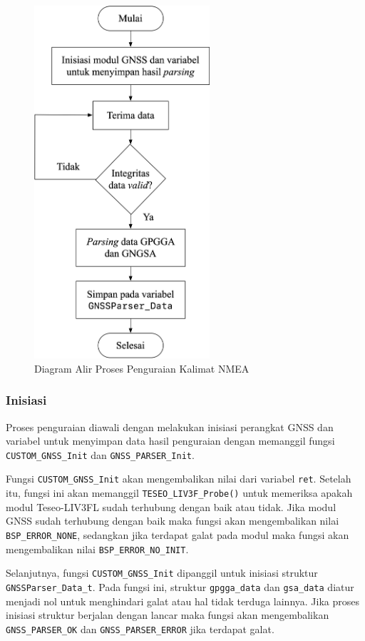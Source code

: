 \begin{figure}[H]
	\centering
	\includegraphics[width=6.5cm]{contents/chapter-3/diagram-parser.png}
	\caption{Diagram Alir Proses Penguraian Kalimat NMEA}
	\label{Fig: flowchart-parsing}
\end{figure}

\subsubsection{Inisiasi}
Proses penguraian diawali dengan melakukan inisiasi perangkat GNSS dan variabel untuk menyimpan data hasil penguraian dengan memanggil fungsi \texttt{CUSTOM\_GNSS\_Init} dan \texttt{GNSS\_PARSER\_Init}. 

Fungsi \texttt{CUSTOM\_GNSS\_Init} akan mengembalikan nilai dari variabel \texttt{ret}. Setelah itu, fungsi ini akan memanggil \texttt{TESEO\_LIV3F\_Probe()} untuk memeriksa apakah modul Teseo-LIV3FL sudah terhubung dengan baik atau tidak. Jika modul GNSS sudah terhubung dengan baik maka fungsi akan mengembalikan nilai \texttt{BSP\_ERROR\_NONE}, sedangkan jika terdapat galat pada modul maka fungsi akan mengembalikan nilai \texttt{BSP\_ERROR\_NO\_INIT}.

Selanjutnya, fungsi  \texttt{CUSTOM\_GNSS\_Init} dipanggil untuk inisiasi struktur \texttt{GNSSParser\_Data\_t}. Pada fungsi ini, struktur \texttt{gpgga\_data} dan \texttt{gsa\_data} diatur menjadi nol untuk menghindari galat atau hal tidak terduga lainnya. Jika proses inisiasi struktur berjalan dengan lancar maka fungsi akan mengembalikan \texttt{GNSS\_PARSER\_OK} dan \texttt{GNSS\_PARSER\_ERROR} jika terdapat galat.

